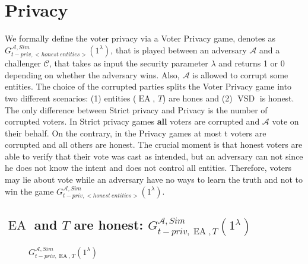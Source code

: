 \documentclass[12pt]{article}
\DeclareMathOperator{\vsd}{VSD}
\DeclareMathOperator{\ea}{EA}
\begin{document}
\section{Privacy}
We formally define the voter privacy via a Voter Privacy game, denotes as $G_{t-priv,<honest~entities>}^{\mathcal{A}, Sim}(1^{\lambda})$, that is played between an adversary $\mathcal{A}$ and a challenger $\mathcal{C}$, that takes as input the security parameter $\lambda$ and returns 1 or 0 depending on whether the adversary wins.  Also, $\mathcal{A}$ is  allowed to corrupt some entities. The choice of the corrupted parties splits the Voter Privacy game into two different scenarios: (1) entities ($\ea$, $T$) are hones and (2) $\vsd$ is honest. \\
The only difference between Strict privacy and Privacy is the number of corrupted voters. In Strict privacy games \textbf{all} voters are corrupted and  $\mathcal{A}$ vote on their behalf. On the contrary, in the Privacy games at most t voters are corrupted and all others are honest. The crucial moment is that honest voters are able to verify that their vote was cast as intended, but an adversary can not since he does not know the intent and does not control all entities. Therefore, voters may lie about vote while an adversary have no ways to learn the truth and not to win the game $G_{t-priv,<honest~entities>}^{\mathcal{A}, Sim}(1^{\lambda})$. 

 \subsection{$\ea$ and $T$ are honest: $G_{t-priv,\ea,T}^{\mathcal{A}, Sim}(1^{\lambda})$}
  \begin{figure}
 
        \caption{  $G_{t-priv,\ea,T}^{\mathcal{A}, Sim}(1^{\lambda})$}
\end{figure}
 
\end{document}

